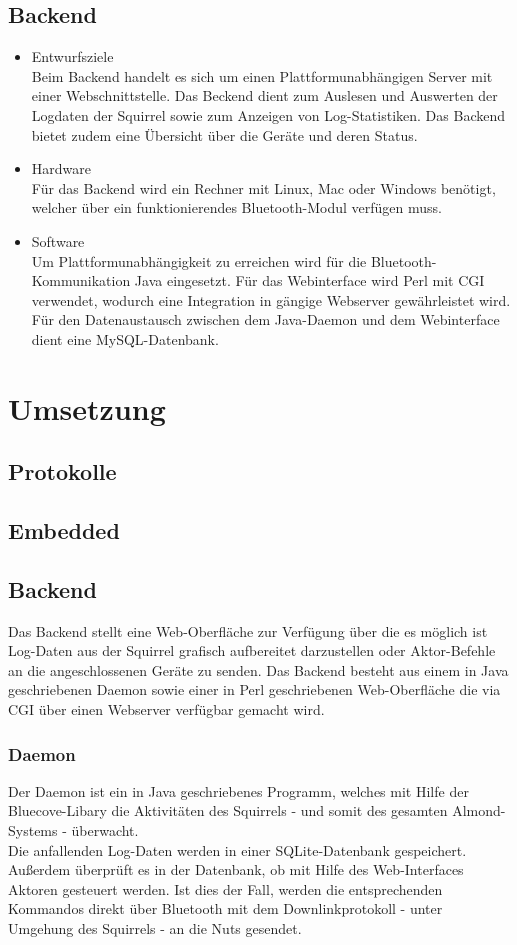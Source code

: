\documentclass[12pt,a4paper]{article}
\begin{document}
\subsection{Backend}
\begin{itemize}
	\item Entwurfsziele\\
	Beim Backend handelt es sich um einen Plattformunabhängigen Server mit einer Webschnittstelle. Das Beckend dient zum Auslesen und Auswerten der Logdaten der Squirrel sowie zum Anzeigen von Log-Statistiken. Das Backend bietet zudem eine Übersicht über die Geräte und deren Status.
	\item Hardware\\
	Für das Backend wird ein Rechner mit Linux, Mac oder Windows benötigt, welcher über ein funktionierendes Bluetooth-Modul verfügen muss.
	\item Software\\
	Um Plattformunabhängigkeit zu erreichen wird für die Bluetooth-Kommunikation Java eingesetzt. Für das Webinterface wird Perl mit CGI verwendet, wodurch eine Integration in gängige Webserver gewährleistet wird. Für den Datenaustausch zwischen dem Java-Daemon und dem Webinterface dient eine MySQL-Datenbank.
\end{itemize}
\section{Umsetzung}
\subsection{Protokolle}
\subsection{Embedded}
\subsection{Backend}
Das Backend stellt eine Web-Oberfläche zur Verfügung über die es möglich ist Log-Daten aus der Squirrel grafisch aufbereitet darzustellen oder Aktor-Befehle an die angeschlossenen Geräte zu senden. Das Backend besteht aus einem in Java geschriebenen Daemon sowie einer in Perl geschriebenen Web-Oberfläche die via CGI über einen Webserver verfügbar gemacht wird.

\subsubsection{Daemon}
Der Daemon ist ein in Java geschriebenes Programm, welches mit Hilfe der Bluecove-Libary die Aktivitäten des Squirrels - und somit des gesamten Almond-Systems - überwacht.\\
Die anfallenden Log-Daten werden in einer SQLite-Datenbank gespeichert.\\
Außerdem überprüft es in der Datenbank, ob mit Hilfe des Web-Interfaces Aktoren gesteuert werden. Ist dies der Fall, werden die entsprechenden Kommandos direkt über Bluetooth mit dem Downlinkprotokoll - unter Umgehung des Squirrels - an die Nuts gesendet.\\
\end{document}
